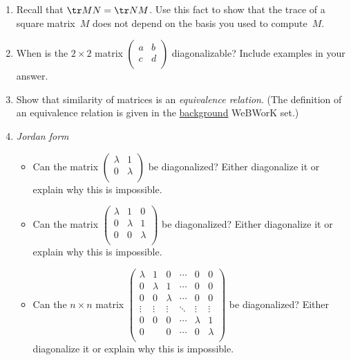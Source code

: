 \begin{enumerate}
\item Recall that $\tr MN = \tr NM$. Use this fact to show that the trace of a square matrix~$M$ does not depend on the basis you used to compute~$M$.



\item When is the $2\times 2$ matrix 
$\begin{pmatrix}
a & b \\
c & d \\
\end{pmatrix}$ diagonalizable?  Include examples in your answer.


\item Show that similarity of matrices is an \hypertarget{equivalence}{\emph{equivalence relation}}.  (The definition of an equivalence relation is given in the  \href{\webworkurl Background/4/}{background} WeBWorK set.)


\item {\itshape Jordan form} \label{prob_jordan_form}
\begin{itemize}
\item Can the matrix \(\begin{pmatrix}
\lambda & 1 \\
0 & \lambda \\
\end{pmatrix}\) be diagonalized? Either diagonalize it or explain why this is impossible.
\item Can the matrix \(\begin{pmatrix}
\lambda & 1 & 0 \\
0 & \lambda & 1 \\
0 & 0 & \lambda \\
\end{pmatrix}\) be diagonalized? Either diagonalize it or explain why this is impossible.
\item Can the \(n \times n\) matrix \(\begin{pmatrix}
\lambda & 1 & 0 & \cdots & 0 & 0 \\
0 & \lambda & 1 & \cdots & 0 & 0 \\
0 & 0 & \lambda & \cdots & 0 & 0 \\
\vdots & \vdots & \vdots & \ddots & \vdots & \vdots \\
0 & 0 & 0 & \cdots & \lambda & 1 \\
0 &  & 0 & \cdots & 0 & \lambda \\
\end{pmatrix}\) be diagonalized? Either diagonalize it or explain why this is impossible.


\end{itemize}
\end{enumerate}
